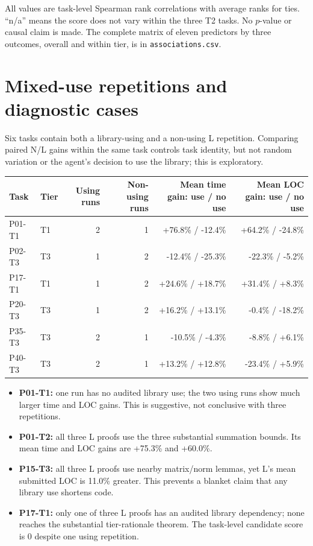 \documentclass[10pt]{article}
\newcommand{\sourcepath}[1]{\nolinkurl{#1}}
\begin{document}
All values are task-level Spearman rank correlations with average ranks for ties. ``n/a'' means the score does not vary within the three T2 tasks. No $p$-value or causal claim is made. The complete matrix of eleven predictors by three outcomes, overall and within tier, is in \sourcepath{associations.csv}.

\clearpage
\section{Mixed-use repetitions and diagnostic cases}

Six tasks contain both a library-using and a non-using L repetition. Comparing paired N/L gains within the same task controls task identity, but not random variation or the agent's decision to use the library; this is exploratory.

\begin{center}
\begin{tabular}{@{}llrrrr@{}}
\toprule
Task & Tier & Using runs & Non-using runs & Mean time gain: use / no use & Mean LOC gain: use / no use \\
\midrule
P01-T1 & T1 & 2 & 1 & +76.8\% / -12.4\% & +64.2\% / -24.8\% \\
P02-T3 & T3 & 1 & 2 & -12.4\% / -25.3\% & -22.3\% / -5.2\% \\
P17-T1 & T1 & 1 & 2 & +24.6\% / +18.7\% & +31.4\% / +8.3\% \\
P20-T3 & T3 & 1 & 2 & +16.2\% / +13.1\% & -0.4\% / -18.2\% \\
P35-T3 & T3 & 2 & 1 & -10.5\% / -4.3\% & -8.8\% / +6.1\% \\
P40-T3 & T3 & 2 & 1 & +13.2\% / +12.8\% & -23.4\% / +5.9\% \\
\bottomrule
\end{tabular}
\end{center}

\begin{itemize}
\item \textbf{P01-T1:} one run has no audited library use; the two using runs show much larger time and LOC gains. This is suggestive, not conclusive with three repetitions.
\item \textbf{P01-T2:} all three L proofs use the three substantial summation bounds. Its mean time and LOC gains are +75.3\% and +60.0\%.
\item \textbf{P15-T3:} all three L proofs use nearby matrix/norm lemmas, yet L's mean submitted LOC is 11.0\% greater. This prevents a blanket claim that any library use shortens code.
\item \textbf{P17-T1:} only one of three L proofs has an audited library dependency; none reaches the substantial tier-rationale theorem. The task-level candidate score is 0 despite one using repetition.
\end{itemize}
\end{document}
